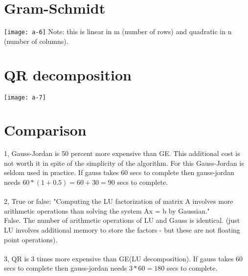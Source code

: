 \documentclass{article}
\begin{document}
\pagebreak
\section*{Gram-Schmidt}
\texttt{[image: a-6]}
Note: this is linear in m (number of rows) and quadratic in n (number
of columns).\\  

\pagebreak
\section*{QR decomposition}
\texttt{[image: a-7]}


\pagebreak
\section*{Comparison}
1, Gauss-Jordan is 50 percent more expensive than GE. This additional cost is not worth it in spite of the simplicity
of the algorithm. For this Gauss-Jordan is seldom used in practice. If gauss takes 60 secs to complete then gauss-jordan needs
$60*(1+0.5)=60+30=90$ secs to complete.\\
\\
2, True or false: "Computing the LU factorization of matrix A involves more arithmetic operations
than solving the system Ax = b by Gaussian."\\
False. 
The number of arithmetic operations of LU and Gauss is identical. (just LU involves additional memory to store the factors -
but these are not floating point operations).\\
\\
3, QR is 3 times more expensive than GE(LU decomposition). If gauss takes 60 secs to complete then gauss-jordan needs
$3*60 = 180$ secs to complete.\\
\end{document}
